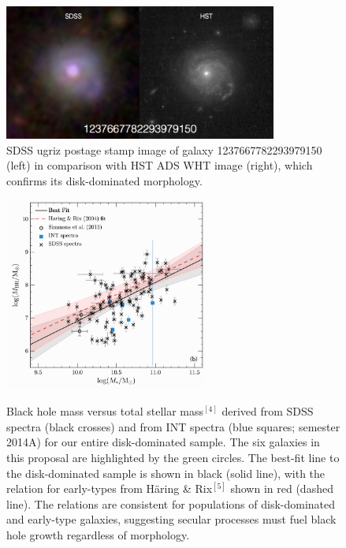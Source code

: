 \documentclass[12pt]{article}
\begin{document}
\begin{figure}
\begin{centering}
\includegraphics[width=0.8\textwidth]{fig3.png} \\
\caption{SDSS ugriz postage stamp image of galaxy 1237667782293979150 (left) in comparison with HST ADS WHT image (right), which confirms its disk-dominated morphology.}

\vspace{1.5em}

\includegraphics[width=0.6\textwidth]{fig2_r.pdf} \\
\caption{Black hole mass versus total stellar mass$^{[4]}$ derived from SDSS spectra (black crosses) and from INT spectra (blue squares; semester 2014A) for our entire disk-dominated sample. The six galaxies in this proposal are highlighted by the green circles. The best-fit line to the disk-dominated sample is shown in black (solid line), with the relation for early-types from Häring \& Rix$^{[5]}$ shown in red (dashed line). The relations are consistent for populations of disk-dominated and early-type galaxies, suggesting secular processes must fuel black hole growth regardless of morphology.}
\end{centering}

\end{figure}
\end{document}
